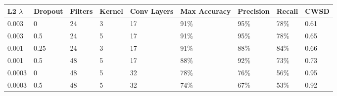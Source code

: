 \documentclass[10pt]{article}
\begin{document}
\begin{minipage}{\textwidth}
    \begin{center}
        \begin{tabular}{|l|l|l|l|l|l|l|l|l|}
            \hline
            L2 $\lambda$ & Dropout & Filters & Kernel & Conv Layers & Max Accuracy & Precision & Recall & CWSD \\
            \hline
            0.003 & 0 & 24 & 3 & 17 & 91\% & 95\% & 78\% & 0.61 \\
            \hline
            0.003 & 0.5 & 24 & 5 & 17 & 91\% & 95\% & 78\% & 0.65 \\
            \hline
            0.001 & 0.25 & 24 & 3 & 17 & 91\% & 88\% & 84\% & 0.66 \\
            \hline
            0.001 & 0.5 & 48 & 5 & 17 & 88\% & 92\% & 73\% & 0.73 \\
            \hline
            0.0003 & 0 & 48 & 5 & 32 & 78\% & 76\% & 56\% & 0.95 \\
            \hline
            0.0003 & 0.5 & 48 & 5 & 32 & 74\% & 67\% & 53\% & 0.92 \\
            \hline
        \end{tabular}
    \end{center}
\end{minipage}
\end{document}
